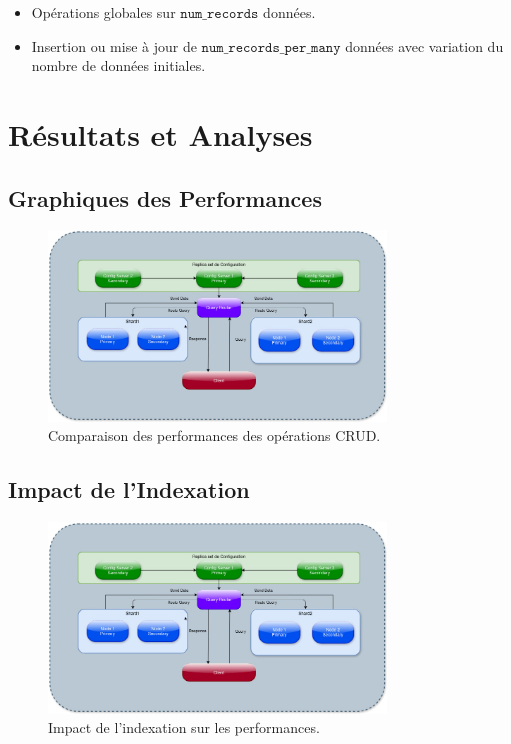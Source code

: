 \documentclass[a4paper,12pt]{report}
\begin{document}
\begin{itemize}
    \item Opérations globales sur $\texttt{num\_records}$ données.
    \item Insertion ou mise à jour de $\texttt{num\_records\_per\_many}$ données avec variation du nombre de données initiales.
\end{itemize}

\chapter{Résultats et Analyses}

\section{Graphiques des Performances}
\begin{figure}[H]
    \centering
    \includegraphics[width=0.8\textwidth]{architectures/MongoDBShards.jpg}
    \caption{Comparaison des performances des opérations CRUD.}
    \label{fig:crud_performance}
\end{figure}
\section{Impact de l'Indexation}
\begin{figure}[H]
    \centering
    \includegraphics[width=0.8\textwidth]{architectures/MongoDBShards.jpg}
    \caption{Impact de l'indexation sur les performances.}
    \label{fig:indexation}
\end{figure}
\end{document}
